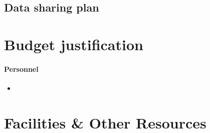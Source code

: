 \documentclass[11pt]{article}
\newcommand{\instructions}[1]{}
\begin{document}
\subsection*{Data sharing plan}

\clearpage
\section*{Budget justification}

\paragraph{Personnel}

\begin{itemize}

\item 
\end{itemize}

\clearpage
\section*{Facilities \& Other Resources}

\instructions{ Instructions: This information is used to assess the
    capability of the organizational resources available to perform
    the effort proposed.  Identify the facilities to be used
    (laboratory, clinical, animal, computer, office, other). If
    appropriate, indicate their capacities, pertinent capabilities,
    relative proximity and extent of availability to the
    project. Describe only those resources that are directly
    applicable to the proposed work. Provide any information
    describing the Other Resources available to the project (e.g.,
    machine shop, electronic shop) and the extent to which they would
    be available to the project.  Describe how the scientific
    environment in which the research will be done contributes to the
    probability of success (e.g., institutional support, physical
    resources, and intellectual rapport). In describing the scientific
    environment in which the work will be done, discuss ways in which
    the proposed studies will benefit from unique features of the
    scientific environment or subject populations or will employ
    useful collaborative arrangements.}

\instructions{ Review criteria: Will the scientific environment in
    which the work will be done contribute to the probability of
    success? Are the institutional support, equipment and other
    physical resources available to the investigators adequate for the
    project proposed? Will the project benefit from unique features of
    the scientific environment, subject populations, or collaborative
    arrangements?}
\end{document}
